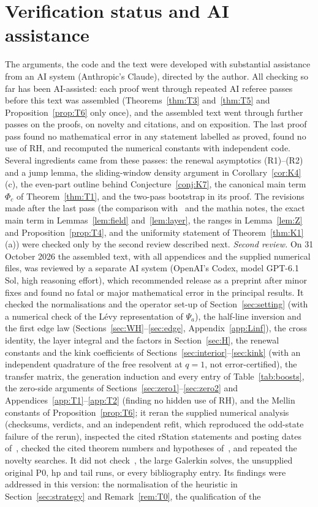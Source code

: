 \documentclass[11pt]{amsart}
\theoremstyle{definition}
\theoremstyle{remark}
\numberwithin{equation}{section}
\begin{document}
\section*{Verification status and AI assistance}
The arguments, the code and the text were developed with substantial assistance from an AI system (Anthropic's Claude), directed by the author. All checking so far has been AI-assisted: each proof went through repeated AI referee passes before this text was assembled (Theorems~\ref{thm:T3} and~\ref{thm:T5} and Proposition~\ref{prop:T6} only once), and the assembled text went through further passes on the proofs, on novelty and citations, and on exposition. The last proof pass found no mathematical error in any statement labelled as proved, found no use of RH, and recomputed the numerical constants with independent code. Several ingredients came from these passes: the renewal asymptotics (R1)--(R2) and a jump lemma, the sliding-window density argument in Corollary~\ref{cor:K4}(c), the even-part outline behind Conjecture~\ref{conj:K7}, the canonical main term $\Phi_c$ of Theorem~\ref{thm:T1}, and the two-pass bootstrap in its proof. The revisions made after the last pass (the comparison with~\cite{BT26} and the mathia notes, the exact main term in Lemmas~\ref{lem:field} and~\ref{lem:layer}, the ranges in Lemma~\ref{lem:Z} and Proposition~\ref{prop:T4}, and the uniformity statement of Theorem~\ref{thm:K1}(a)) were checked only by the second review described next. \emph{Second review.} On 31 October 2026 the assembled text, with all appendices and the supplied numerical files, was reviewed by a separate AI system (OpenAI's Codex, model GPT-6.1 Sol, high reasoning effort), which recommended release as a preprint after minor fixes and found no fatal or major mathematical error in the principal results. It checked the normalisations and the operator set-up of Section~\ref{sec:setting} (with a numerical check of the L\'evy representation of $\Psi_a$), the half-line inversion and the first edge law (Sections~\ref{sec:WH}--\ref{sec:edge}, Appendix~\ref{app:Linf}), the cross identity, the layer integral and the factors in Section~\ref{sec:H}, the renewal constants and the kink coefficients of Sections~\ref{sec:interior}--\ref{sec:kink} (with an independent quadrature of the free resolvent at $q=1$, not error-certified), the transfer matrix, the generation induction and every entry of Table~\ref{tab:boosts}, the zero-side arguments of Sections~\ref{sec:zero1}--\ref{sec:zero2} and Appendices~\ref{app:T1}--\ref{app:T2} (finding no hidden use of RH), and the Mellin constants of Proposition~\ref{prop:T6}; it reran the supplied numerical analysis (checksums, verdicts, and an independent refit, which reproduced the odd-state failure of the rerun), inspected the cited rStation statements and posting dates of~\cite{BT26,BT26a,BT26b}, checked the cited theorem numbers and hypotheses of~\cite{Kw11,Suz26,KW26,Den06,BK17}, and repeated the novelty searches. It did not check~\cite{GS}, the large Galerkin solves, the unsupplied original P0, hp and tail runs, or every bibliography entry. Its findings were addressed in this version: the normalisation of the heuristic in Section~\ref{sec:strategy} and Remark~\ref{rem:T0}, the qualification of the 
\end{document}
